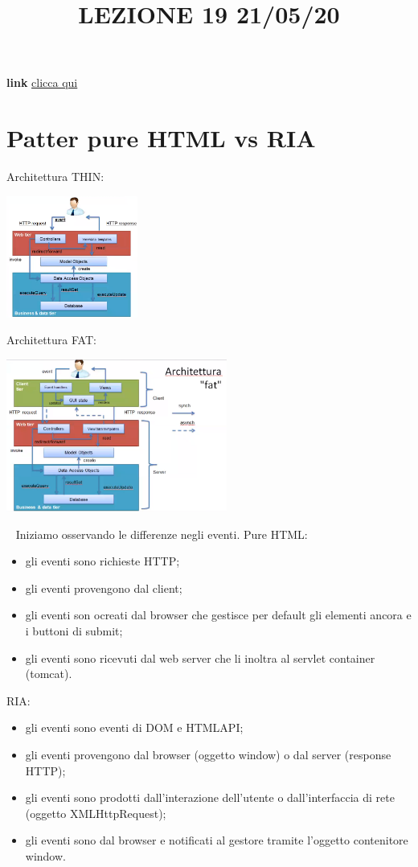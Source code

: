 \title{LEZIONE 19 21/05/20}
\textbf{link} \href{https://web.microsoftstream.com/video/9329ad3d-c8a8-48ab-b415-668ff6193e36?list=user&userId=cfe0965d-9a7c-40e2-be6e-f078296a1914}{clicca qui}
\section{Patter pure HTML vs RIA}
Architettura THIN:
\begin{center}
    \includegraphics[height=4cm]{../lezione19/img1.PNG}
\end{center}
Architettura FAT:
\begin{center}
    \includegraphics[height=5cm]{../lezione19/img2.PNG}
\end{center} 
\ \newline
Iniziamo osservando le differenze negli eventi.\newline
Pure HTML:
\begin{itemize}
    \item gli eventi sono richieste HTTP;
    \item gli eventi provengono dal client;
    \item gli eventi son ocreati dal browser che gestisce per default gli elementi ancora e i buttoni di submit;
    \item gli eventi sono ricevuti dal web server che li inoltra al servlet container (tomcat).
\end{itemize}
RIA:
\begin{itemize}
    \item gli eventi sono eventi di DOM e HTMLAPI;
    \item gli eventi provengono dal browser (oggetto window) o dal server (response HTTP);
    \item gli eventi sono prodotti dall'interazione dell'utente o dall'interfaccia di rete (oggetto XMLHttpRequest);
    \item gli eventi sono dal browser e notificati al gestore tramite l'oggetto contenitore window.
\end{itemize}